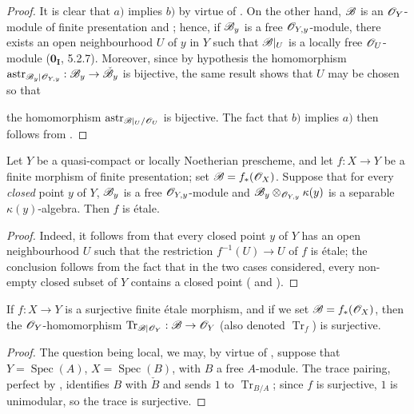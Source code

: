 \begin{proof}
It is clear that $a)$ implies $b)$ by virtue of .
On the other hand, $\mathscr{B}$ is an $\mathscr{O}_Y$-module of finite presentation  and ; hence, if $\mathscr{B}_y$ is a free $\mathscr{O}_{Y,y}$-module, there exists an open neighbourhood $U$ of $y$ in $Y$ such that $\mathscr{B}|_U$ is a locally free $\mathscr{O}_U$-module ($\mathbf{0}_{\mathbf I}$, 5.2.7).  Moreover, since by hypothesis the homomorphism $\operatorname{astr}_{\mathscr{B}_y|\mathscr{O}_{Y,y}}:\mathscr{B}_y\to\check{\mathscr{B}}_y$ is bijective, the same result shows that $U$ may be chosen so that


the homomorphism $\operatorname{astr}_{\mathscr{B}|_U/\mathscr{O}_U}$ is bijective.
The fact that $b)$ implies $a)$ then follows from .
\end{proof}

\begin{corollary}[18.2.5]
\label{IV.18.2.5}
Let $Y$ be a quasi-compact or locally Noetherian prescheme, and let $f:X\to Y$ be a finite morphism of finite presentation;
set $\mathscr{B}=f_*(\mathscr{O}_X)$.
Suppose that for every \emph{closed} point $y$ of $Y$, $\mathscr{B}_y$ is a free $\mathscr{O}_{Y,y}$-module and $\mathscr{B}_y\otimes_{\mathscr{O}_{Y,y}}\kappa(y)$ is a separable $\kappa(y)$-algebra.
Then $f$ is \'etale.
\end{corollary}

\begin{proof}
Indeed, it follows from  that every closed point $y$ of $Y$ has an open neighbourhood $U$ such that the restriction $f^{-1}(U)\to U$ of $f$ is \'etale;
the conclusion follows from the fact that in the two cases considered, every non-empty closed subset of $Y$ contains a closed point ( and ).
\end{proof}

\begin{corollary}[18.2.6]
\label{IV.18.2.6}
If $f:X\to Y$ is a surjective finite \'etale morphism, and if we set $\mathscr{B}=f_*(\mathscr{O}_X)$, then the $\mathscr{O}_Y$-homomorphism $\operatorname{Tr}_{\mathscr{B}|\mathscr{O}_Y}:\mathscr{B}\to\mathscr{O}_Y$  (also denoted $\operatorname{Tr}_f$) is surjective.
\end{corollary}

\begin{proof}
The question being local, we may, by virtue of , suppose that $Y=\operatorname{Spec}(A)$, $X=\operatorname{Spec}(B)$, with $B$ a free $A$-module.
The trace pairing, perfect by , identifies $B$ with $\check{B}$ and sends $1$ to $\operatorname{Tr}_{B/A}$; since $f$ is surjective, $1$ is unimodular, so the trace is surjective.
\end{proof}


